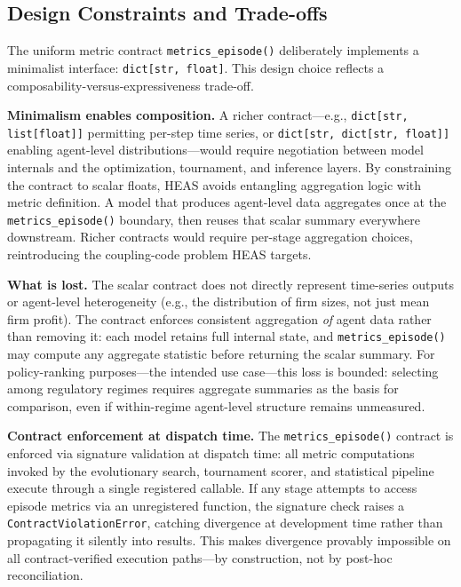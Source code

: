 \documentclass{wscpaperproc}
\begin{document}
\subsection{Design Constraints and Trade-offs}
\label{sec:design-constraints}

The uniform metric contract \texttt{metrics\_episode()} deliberately implements
a minimalist interface: \texttt{dict[str, float]}. This design choice reflects a
composability-versus-expressiveness trade-off.

\textbf{Minimalism enables composition.} A richer contract---e.g.,
\texttt{dict[str, list[float]]} permitting per-step time series, or
\texttt{dict[str, dict[str, float]]} enabling agent-level distributions---would
require negotiation between model internals and the optimization, tournament, and
inference layers. By constraining the contract to scalar floats, HEAS avoids
entangling aggregation logic with metric definition. A model that produces
agent-level data aggregates once at the \texttt{metrics\_episode()} boundary, then
reuses that scalar summary everywhere downstream. Richer contracts would require
per-stage aggregation choices, reintroducing the coupling-code problem HEAS targets.


\textbf{What is lost.} The scalar contract does not directly represent time-series
outputs or agent-level heterogeneity (e.g., the distribution of firm sizes, not
just mean firm profit). The contract enforces consistent aggregation \emph{of} agent data rather than removing it: each model retains full internal state, and \texttt{metrics\_episode()} may compute any aggregate statistic before returning the scalar summary. For policy-ranking purposes---the intended use case---this
loss is bounded: selecting among regulatory regimes requires aggregate summaries
as the basis for comparison, even if within-regime agent-level structure remains
unmeasured.

\textbf{Contract enforcement at dispatch time.} The \texttt{metrics\_episode()}
contract is enforced via signature validation at dispatch time: all metric
computations invoked by the evolutionary search, tournament scorer, and
statistical pipeline execute through a single registered callable. If any stage
attempts to access episode metrics via an unregistered function, the signature
check raises a \texttt{ContractViolationError}, catching divergence at development
time rather than propagating it silently into results. This makes divergence
provably impossible on all contract-verified execution paths---by construction,
not by post-hoc reconciliation.
\end{document}
